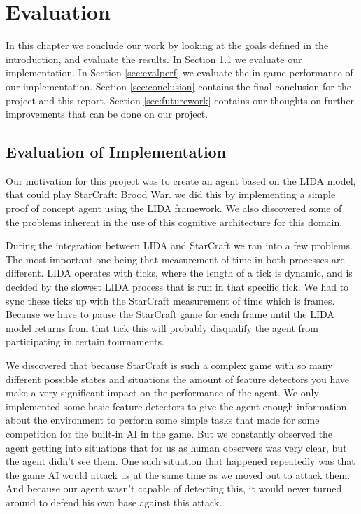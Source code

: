 
\chapter{Evaluation}
In this chapter we conclude our work by looking at the goals defined in the introduction, and evaluate the results.
In Section \ref{sec:evalimp} we evaluate our implementation.
In Section \ref{sec:evalperf} we evaluate the in-game performance of our implementation.
Section \ref{sec:conclusion} contains the final conclusion for the project and this report.
Section \ref{sec:futurework} contains our thoughts on further improvements that can be done on our project.

\section{Evaluation of Implementation}
\label{sec:evalimp}
Our motivation for this project was to create an agent based on the LIDA model, that could play StarCraft: Brood War. we did this by implementing a simple proof of concept agent using the LIDA framework. We also discovered some of the problems inherent in the use of this cognitive architecture for this domain.

During the integration between LIDA and StarCraft we ran into a few problems. The most important one being that measurement of time in both processes are different. LIDA operates with ticks, where the length of a tick is dynamic, and is decided by the slowest LIDA process that is run in that specific tick. We had to sync these ticks up with the StarCraft measurement  of time which is frames. Because we have to pause the StarCraft game for each frame until the LIDA model returns from that tick this will probably disqualify the agent from participating in certain tournaments.

We discovered that because StarCraft is such a complex game with so many different possible states and situations the amount of feature detectors you have make a very significant impact on the performance of the agent. We only implemented some basic feature detectors to give the agent enough information about the environment to perform some simple tasks that made for some competition for the built-in AI in the game. But we constantly observed the agent getting into situations that for us as human observers was very clear, but the agent didn't see them. One such situation that happened repeatedly was that the game AI would attack us at the same time as we moved out to attack them. And because our agent wasn't capable of detecting this, it would never turned around to defend his own base against this attack.

